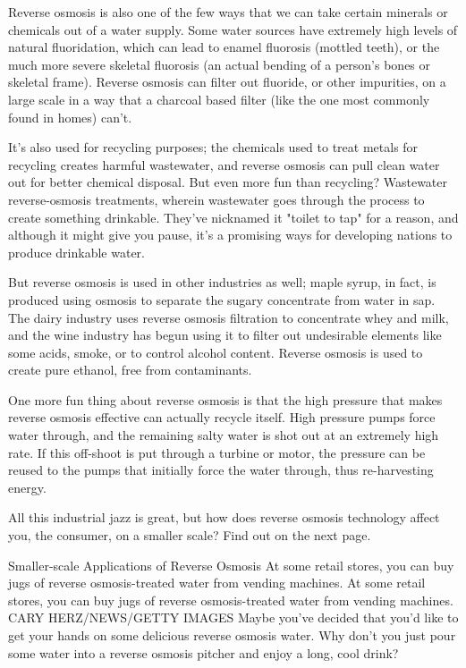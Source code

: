 Reverse osmosis is also one of the few ways that we can take certain minerals or chemicals out of a water supply. Some water sources have extremely high levels of natural fluoridation, which can lead to enamel fluorosis (mottled teeth), or the much more severe skeletal fluorosis (an actual bending of a person's bones or skeletal frame). Reverse osmosis can filter out fluoride, or other impurities, on a large scale in a way that a charcoal based filter (like the one most commonly found in homes) can't.

It's also used for recycling purposes; the chemicals used to treat metals for recycling creates harmful wastewater, and reverse osmosis can pull clean water out for better chemical disposal. But even more fun than recycling? Wastewater reverse-osmosis treatments, wherein wastewater goes through the process to create something drinkable. They've nicknamed it "toilet to tap" for a reason, and although it might give you pause, it's a promising ways for developing nations to produce drinkable water.

But reverse osmosis is used in other industries as well; maple syrup, in fact, is produced using osmosis to separate the sugary concentrate from water in sap. The dairy industry uses reverse osmosis filtration to concentrate whey and milk, and the wine industry has begun using it to filter out undesirable elements like some acids, smoke, or to control alcohol content. Reverse osmosis is used to create pure ethanol, free from contaminants.

One more fun thing about reverse osmosis is that the high pressure that makes reverse osmosis effective can actually recycle itself. High pressure pumps force water through, and the remaining salty water is shot out at an extremely high rate. If this off-shoot is put through a turbine or motor, the pressure can be reused to the pumps that initially force the water through, thus re-harvesting energy.

All this industrial jazz is great, but how does reverse osmosis technology affect you, the consumer, on a smaller scale? Find out on the next page.

Smaller-scale Applications of Reverse Osmosis
At some retail stores, you can buy jugs of reverse osmosis-treated water from vending machines.
At some retail stores, you can buy jugs of reverse osmosis-treated water from vending machines.
CARY HERZ/NEWS/GETTY IMAGES
Maybe you've decided that you'd like to get your hands on some delicious reverse osmosis water. Why don't you just pour some water into a reverse osmosis pitcher and enjoy a long, cool drink?

